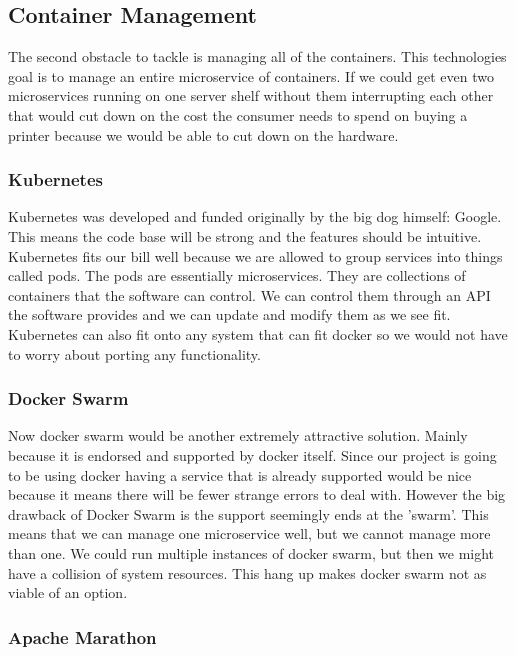 \documentclass[onecolumn, draftclsnofoot,10pt, compsoc]{IEEEtran}
\begin{document}
\subsection{Container Management}

The second obstacle to tackle is managing all of the containers. This technologies goal is to manage an entire microservice of containers. If we could get even two microservices running on one server shelf without them interrupting each other that would cut down on the cost the consumer needs to spend on buying a printer because we would be able to cut down on the hardware.


\subsubsection{Kubernetes}

Kubernetes was developed and funded originally by the big dog himself: Google. This means the code base will be strong and the features should be intuitive. Kubernetes fits our bill well because we are allowed to group services into things called pods. The pods are essentially microservices. They are collections of containers that the software can control. We can control them through an API the software provides and we can update and modify them as we see fit. Kubernetes can also fit onto any system that can fit docker so we would not have to worry about porting any functionality.

\subsubsection{Docker Swarm}

Now docker swarm would be another extremely attractive solution. Mainly because it is endorsed and supported by docker itself. Since our project is going to be using docker having a service that is already supported would be nice because it means there will be fewer strange errors to deal with. However the big drawback of Docker Swarm is the support seemingly ends at the 'swarm'. This means that we can manage one microservice well, but we cannot manage more than one. We could run multiple instances of docker swarm, but then we might have a collision of system resources. This hang up makes docker swarm not as viable of an option.

\subsubsection{Apache Marathon}
\end{document}
